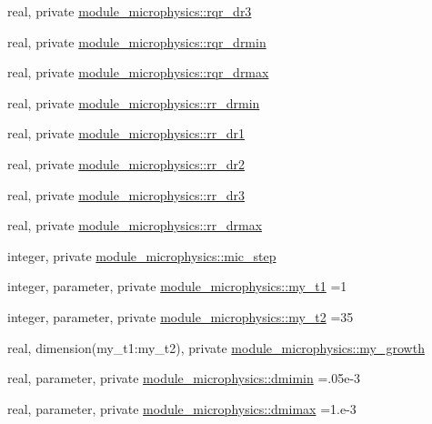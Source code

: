 \begin{DoxyCompactItemize}
\item 
real, private \hyperlink{namespacemodule__microphysics_a1408a4c383136f8beb5d92049a5461a1}{module\+\_\+microphysics\+::rqr\+\_\+dr3}
\item 
real, private \hyperlink{namespacemodule__microphysics_af455571cfd5c41222b9cf86fd014a30f}{module\+\_\+microphysics\+::rqr\+\_\+drmin}
\item 
real, private \hyperlink{namespacemodule__microphysics_ae58b71fa9e96b0836c12a143455ca83b}{module\+\_\+microphysics\+::rqr\+\_\+drmax}
\item 
real, private \hyperlink{namespacemodule__microphysics_a6f0adb81dca26899ff77f0a454206559}{module\+\_\+microphysics\+::rr\+\_\+drmin}
\item 
real, private \hyperlink{namespacemodule__microphysics_a31a6bca21f180e2715bbefa18ef32b08}{module\+\_\+microphysics\+::rr\+\_\+dr1}
\item 
real, private \hyperlink{namespacemodule__microphysics_a47ffe9826a0f85b6bf41c1cf06cf148f}{module\+\_\+microphysics\+::rr\+\_\+dr2}
\item 
real, private \hyperlink{namespacemodule__microphysics_afbed7ecd787abc8db3c7ff6160412fa1}{module\+\_\+microphysics\+::rr\+\_\+dr3}
\item 
real, private \hyperlink{namespacemodule__microphysics_af631f5533a9284cf93087bb35396a9de}{module\+\_\+microphysics\+::rr\+\_\+drmax}
\item 
integer, private \hyperlink{namespacemodule__microphysics_acb3899d31d6f2079a2d41c3e551e3443}{module\+\_\+microphysics\+::mic\+\_\+step}
\item 
integer, parameter, private \hyperlink{namespacemodule__microphysics_aae73524f22f4bc2373aaa5d8a6f7e7d6}{module\+\_\+microphysics\+::my\+\_\+t1} =1
\item 
integer, parameter, private \hyperlink{namespacemodule__microphysics_a01af6bac32c88fd12ba020f66ad0ae80}{module\+\_\+microphysics\+::my\+\_\+t2} =35
\item 
real, dimension(my\+\_\+t1\+:my\+\_\+t2), private \hyperlink{namespacemodule__microphysics_a05041f6bd94be58f8b3bddac6b374b41}{module\+\_\+microphysics\+::my\+\_\+growth}
\item 
real, parameter, private \hyperlink{namespacemodule__microphysics_a10a6db795f339c47c5afd6916d0c196b}{module\+\_\+microphysics\+::dmimin} =.\+05e-\/3
\item 
real, parameter, private \hyperlink{namespacemodule__microphysics_ab71ad8ff5f6f170585e96194373be5cc}{module\+\_\+microphysics\+::dmimax} =1.e-\/3

\end{DoxyCompactItemize}
